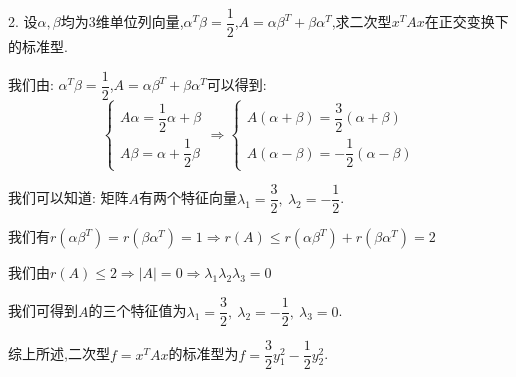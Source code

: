 2. 设$\alpha, \beta$均为$3$维单位列向量,$\alpha^{T}\beta=\dfrac{1}{2}$,$A=\alpha\beta^{T}+\beta\alpha^{T}$,求二次型$x^{T}Ax$在正交变换下的标准型.
\begin{solution}
	
	我们由: $\alpha^{T}\beta=\dfrac{1}{2}$,$A=\alpha\beta^{T}+\beta\alpha^{T}$可以得到: 
	$$\left\lbrace
	\begin{array}{l}
		A\alpha=\dfrac{1}{2}\alpha+\beta\\
		A\beta=\alpha+\dfrac{1}{2}\beta
	\end{array}
	\right. \Rightarrow \left\lbrace
	\begin{array}{l}
		A(\alpha+\beta)=\dfrac{3}{2}(\alpha+\beta)\\
		A(\alpha-\beta)=-\dfrac{1}{2}(\alpha-\beta)
	\end{array}
	\right. $$
	
	我们可以知道: 矩阵$A$有两个特征向量$\lambda_{1}=\dfrac{3}{2},\ \lambda_{2}=-\dfrac{1}{2}$.
	
	我们有$r(\alpha\beta^{T})=r(\beta\alpha^{T})=1\Rightarrow r(A)\leq r(\alpha\beta^{T})+r(\beta\alpha^{T})=2$
	
	我们由$r(A)\leq 2\Rightarrow |A|=0\Rightarrow \lambda_{1}\lambda_{2}\lambda_{3}=0$
	
	我们可得到$A$的三个特征值为$\lambda_{1}=\dfrac{3}{2},\ \lambda_{2}=-\dfrac{1}{2},\ \lambda_{3}=0$.
	
	综上所述,二次型$f=x^{T}Ax$的标准型为$f=\dfrac{3}{2}y_{1}^2-\dfrac{1}{2}y_{2}^{2}$.
\end{solution}
